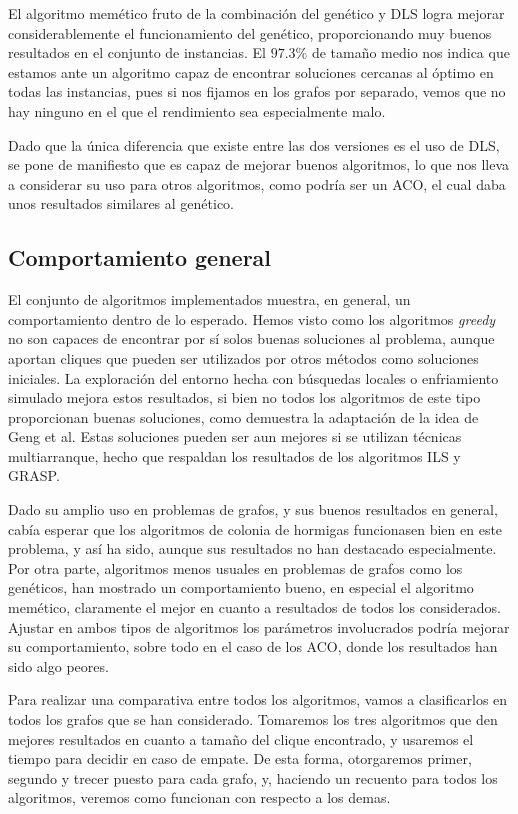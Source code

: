 El algoritmo memético fruto de la combinación del genético y DLS logra mejorar
considerablemente el funcionamiento del genético, proporcionando muy buenos resultados
en el conjunto de instancias. El $97.3\%$ de tamaño medio nos indica que estamos
ante un algoritmo capaz de encontrar soluciones cercanas al óptimo en todas las
instancias, pues si nos fijamos en los grafos por separado, vemos que no hay ninguno
en el que el rendimiento sea especialmente malo.

Dado que la única diferencia que existe entre las dos versiones es el uso de DLS,
se pone de  manifiesto que es capaz de mejorar buenos algoritmos, lo que nos lleva
a considerar su uso para otros algoritmos, como podría ser un ACO, el cual daba
unos resultados similares al genético.

\subsection{Comportamiento general}

El conjunto de algoritmos implementados muestra, en general, un comportamiento dentro de
lo esperado. Hemos visto como los algoritmos \textit{greedy} no son capaces de encontrar
por sí solos buenas soluciones al problema, aunque aportan cliques que pueden ser utilizados
por otros métodos como soluciones iniciales. La exploración del entorno hecha con búsquedas
locales o enfriamiento simulado mejora estos resultados, si bien no todos los algoritmos de
este tipo proporcionan buenas soluciones, como demuestra la adaptación de la idea de Geng
et al. Estas soluciones pueden ser aun mejores si se utilizan técnicas multiarranque,
hecho que respaldan los resultados de los algoritmos ILS y GRASP.

Dado su amplio uso en problemas de grafos, y sus buenos resultados en general, cabía
esperar que los algoritmos de colonia de hormigas funcionasen bien en este problema, y
así ha sido, aunque sus resultados no han destacado especialmente. Por otra parte,
algoritmos menos usuales en problemas de grafos como los genéticos, han mostrado un
comportamiento bueno, en especial el algoritmo memético, claramente el mejor en
cuanto a resultados de todos los considerados. Ajustar en ambos tipos de algoritmos
los parámetros involucrados podría mejorar su comportamiento, sobre todo en el caso
de los ACO, donde los resultados han sido algo peores.

Para realizar una comparativa entre todos los algoritmos, vamos a clasificarlos en
todos los grafos que se han considerado. Tomaremos los tres algoritmos que den mejores
resultados en cuanto a tamaño del clique encontrado, y usaremos el tiempo para decidir
en caso de empate. De esta forma, otorgaremos primer, segundo y trecer puesto para
cada grafo, y, haciendo un recuento para todos los algoritmos, veremos como funcionan
con respecto a los demas.

